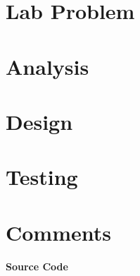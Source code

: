 \documentclass{article}
\begin{document}
\begin{normalsize} %

\section*{Lab Problem} 



\vskip 0.25in
\section*{Analysis}



\vskip 0.25in
\section*{Design}



\vskip 0.25in
\section*{Testing}



\vskip 0.25in
\section*{Comments}



\end{normalsize}
\begin{normalsize} %
\pagebreak
\begin{center}
\Large\textbf{Source Code}
\end{center}
\vskip 0.25in
\ttfamily
\footnotesize


\inputminted[linenos]{C}{example.c}
\end{normalsize}
\end{document}
